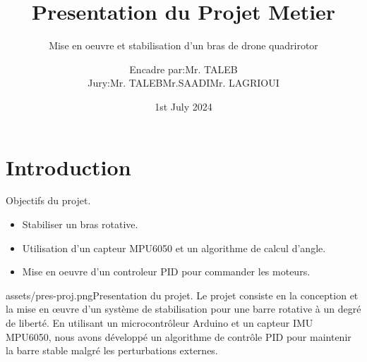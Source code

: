 \documentclass{beamer}
\title{Presentation du Projet Metier}
\subtitle{Mise en oeuvre et stabilisation d'un bras de drone quadrirotor}
\author{Encadre par:\hspace*{.3cm}Mr. TALEB\\Jury:\hspace*{.3cm}Mr. TALEB\hspace*{.3cm}Mr.SAADI\hspace*{.3cm}Mr. LAGRIOUI}
\date{1st July 2024}
\newcommand{\hrefcol}[2]{\textcolor{cyan}{\href{#1}{#2}}}
\begin{document}
\maketitle







\section{Introduction}

\begin{frame}{Objectifs du projet.}
	\begin{itemize}
		\item Stabiliser un bras rotative.
		\item Utilisation d'un capteur MPU6050 et un algorithme de calcul d'angle.
		\item Mise en oeuvre d'un controleur PID pour commander les moteurs.
	\end{itemize}
	\end{frame}

\begin{sidepic}{assets/pres-proj.png}{Presentation du projet.}
	Le projet consiste en la conception et la mise en œuvre d'un système de stabilisation pour une barre rotative à un degré de liberté. En utilisant un microcontrôleur Arduino et un capteur IMU MPU6050, nous avons développé un algorithme de contrôle PID pour maintenir la barre stable malgré les perturbations externes.
\end{sidepic}
\end{document}
